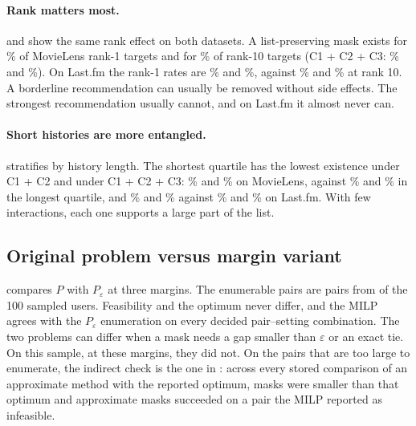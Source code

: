 \documentclass[11pt]{article}
\newcommand{\Peps}{P_\varepsilon}
\begin{document}
\paragraph{Rank matters most.}  and  show the same rank effect on both datasets.
A list-preserving mask exists for \MLBROne\% of MovieLens rank-1 targets and for \MLBRTen\% of rank-10 targets
(C1 + C2 + C3: \MLCROne\% and \MLCRTen\%). On Last.fm the rank-1 rates are \LFBROne\% and \LFCROne\%, against
\LFBRTen\% and \LFCRTen\% at rank 10. A borderline recommendation can usually be removed without side effects. The
strongest recommendation usually cannot, and on Last.fm it almost never can.

\paragraph{Short histories are more entangled.}  stratifies by history length. The shortest
quartile has the lowest existence under C1 + C2 and under C1 + C2 + C3: \MLBQShort\% and \MLCQShort\% on MovieLens, against
\MLBQLong\% and \MLCQLong\% in the longest quartile, and \LFBQShort\% and \LFCQShort\% against \LFBQLong\% and \LFCQLong\% on Last.fm.
With few interactions, each one supports a large part of the list.

\subsection{Original problem versus margin variant}
\label{sec:semantics}

\begin{table}[t]
\centering
\caption{$P$ versus $\Peps$ on the MovieLens margin sample, for every pair with $|D_u(t)|\le\EnumMax$. Both problems
are solved by exhaustive search. The agreement column sums the three settings, so the denominator is three times the
number of pairs. The main samples were not enumerated.}
\label{tab:semantics}

\end{table}

 compares $P$ with $\Peps$ at three margins. The enumerable pairs are \EnumPairs{} pairs from
\EnumUsers{} of the 100 sampled users. Feasibility and the optimum never differ, and the MILP agrees with the
$\Peps$ enumeration on every decided pair--setting combination. The two problems can differ when a mask needs a gap
smaller than $\varepsilon$ or an exact tie. On this sample, at these margins, they did not. On the pairs that are
too large to enumerate, the indirect check is the one in : across every stored comparison of an
approximate method with the reported optimum, \SmallerThanOpt{} masks were smaller than that optimum and
\SuccessOnInf{} approximate masks succeeded on a pair the MILP reported as infeasible.
\end{document}
